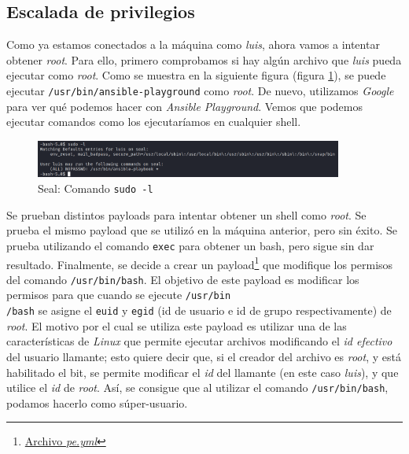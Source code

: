 \subsection{Escalada de privilegios}

Como ya estamos conectados a la máquina como \textit{luis}, ahora vamos a intentar obtener \textit{root}. Para ello, primero comprobamos si hay algún archivo que \textit{luis} pueda ejecutar como \textit{root}. Como se muestra en la siguiente figura (figura \ref{fig:seal-ssh-luis}), se puede ejecutar \texttt{/usr/bin/ansible-playground} como \textit{root}. De nuevo, utilizamos \textit{Google} para ver qué podemos hacer con \textit{Ansible Playground}\cite{ansible-playbooks}. Vemos que podemos ejecutar comandos como los ejecutaríamos en cualquier shell.
\begin{figure}[h]
    \centering
    \includegraphics[width=0.9\textwidth]{images/machines/seal/sudo-l-luis.png}
    \caption{Seal: Comando \texttt{sudo -l}}
    \label{fig:seal-ssh-luis}
\end{figure}

Se prueban distintos payloads para intentar obtener un shell como \textit{root}. Se prueba el mismo payload que se utilizó en la máquina anterior, pero sin éxito. Se prueba utilizando el comando \texttt{exec} para obtener un bash, pero sigue sin dar resultado. Finalmente, se decide a crear un payload\footnote{\href{https://github.com/VictorNS69/TFM/blob/main/machines/seal/pe.yml}{Archivo \textit{pe.yml}}} que modifique los permisos del comando \texttt{/usr/bin/bash}. El objetivo de este payload es modificar los permisos para que cuando se ejecute \texttt{/usr/bin\\/bash} se asigne el \texttt{euid} y \texttt{egid} (id de usuario e id de grupo respectivamente) de \textit{root}. El motivo por el cual se utiliza este payload es utilizar una de las características de \textit{Linux} que permite ejecutar archivos modificando el \textit{id efectivo} del usuario llamante; esto quiere decir que, si el creador del archivo es \textit{root}, y está habilitado el bit, se permite modificar el \textit{id} del llamante (en este caso \textit{luis}), y que utilice el \textit{id} de \textit{root}. Así, se consigue que al utilizar el comando \texttt{/usr/bin/bash}, podamos hacerlo como súper-usuario.\\

